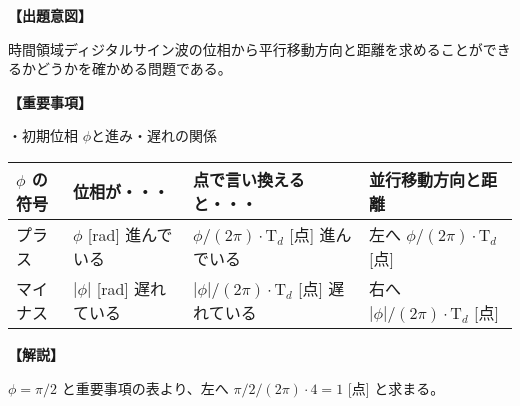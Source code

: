 \noindent \textbf{【出題意図】}

\bigskip
\noindent 時間領域ディジタルサイン波の位相から平行移動方向と距離を求めることができるかどうかを確かめる問題である。

\vspace{1em}
\noindent \textbf{【重要事項】}

\noindent ・初期位相 $\phi$と進み・遅れの関係

\medskip
\begin{center}
\small
\begin{tabularx}{0.9\fbwidth}{|X|X|X|X|}
\hline
$\phi$ の符号&  位相が・・・   & 点で言い換えると・・・   & 並行移動方向と距離 \\
\hline
プラス &  $\phi$ [rad] 進んでいる & $\phi/(2\pi) \cdot \textrm{T}_d$ [点] 進んでいる & 左へ $\phi/(2\pi) \cdot \textrm{T}_d$ [点] \\
\hline
マイナス &  $|\phi|$ [rad] 遅れている & $|\phi|/(2\pi) \cdot \textrm{T}_d$ [点] 遅れている & 右へ $|\phi|/(2\pi) \cdot \textrm{T}_d$ [点] \\
\hline
\end{tabularx}
\end{center}

\bigskip

\vspace{1em}
\noindent \textbf{【解説】}

\bigskip
\noindent $\phi = \pi/2$ と重要事項の表より、左へ $\pi/2/(2\pi) \cdot 4 = 1$ [点] と求まる。
